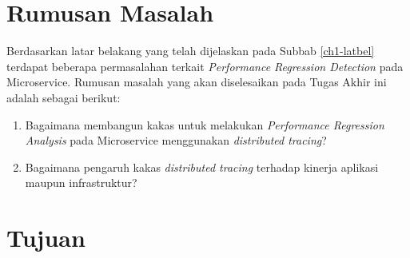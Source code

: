 %
%


\section{Rumusan Masalah}\label{RumusanMasalah}

Berdasarkan latar belakang yang telah dijelaskan pada Subbab \ref{ch1-latbel} terdapat beberapa permasalahan terkait \textit{Performance Regression Detection} pada Microservice. Rumusan masalah yang akan diselesaikan pada Tugas Akhir ini adalah sebagai berikut:
\begin{enumerate}
	\item Bagaimana membangun kakas untuk melakukan \textit{Performance Regression Analysis} pada Microservice menggunakan \textit{distributed tracing}?
	\item Bagaimana pengaruh kakas \textit{distributed tracing} terhadap kinerja aplikasi maupun infrastruktur?
\end{enumerate}

\section{Tujuan}

